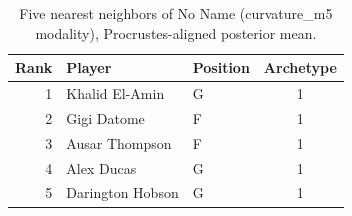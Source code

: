 \begin{table}[htbp]
  \centering\small
  \begin{tabular}{rllc}
    \toprule
    Rank & Player & Position & Archetype \\
    \midrule
    1 & Khalid El-Amin & G & 1 \\
    2 & Gigi Datome & F & 1 \\
    3 & Ausar Thompson & F & 1 \\
    4 & Alex Ducas & G & 1 \\
    5 & Darington Hobson & G & 1 \\
    \bottomrule
  \end{tabular}
  \caption{Five nearest neighbors of No Name (curvature_m5 modality), Procrustes-aligned posterior mean.}
  \label{tab:No_Name_neighbors_curvature_m5}
\end{table}

